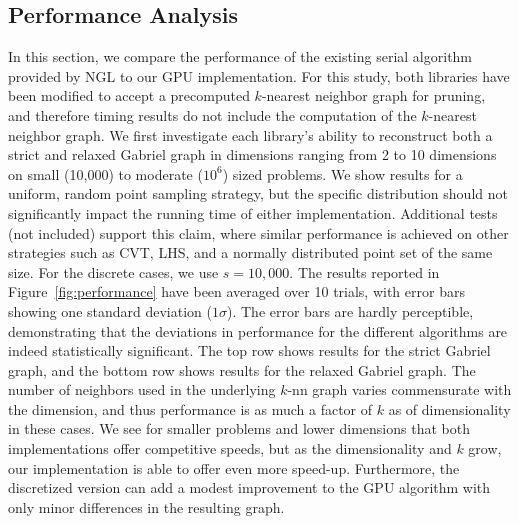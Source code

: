 \subsection{Performance Analysis}

In this section, we compare the performance of the existing serial algorithm provided by NGL to our GPU implementation.
%
For this study, both libraries have been modified to accept a precomputed $k$-nearest neighbor graph for pruning, and therefore timing results do not include the computation of the $k$-nearest neighbor graph.
%
We first investigate each library's ability to reconstruct both a strict and relaxed Gabriel graph in dimensions ranging from 2 to 10 dimensions on small (10,000) to moderate ($10^6$) sized problems.
%
We show results for a uniform, random point sampling strategy, but the specific distribution should not significantly impact the running time of either implementation.
%
Additional tests (not included) support this claim, where similar performance is achieved on other strategies such as CVT, LHS, and a normally distributed point set of the same size.
%
For the discrete cases, we use $s=10,000$.
%
The results reported in Figure~\ref{fig:performance} have been averaged over 10 trials, with error bars showing one standard deviation ($1\sigma$).
%
The error bars are hardly perceptible, demonstrating that the deviations in performance for the different algorithms are indeed statistically significant.
%
The top row shows results for the strict Gabriel graph, and the bottom row shows results for the relaxed Gabriel graph.
%
The number of neighbors used in the underlying $k$-nn graph varies commensurate with the dimension, and thus performance is as much a factor of $k$ as of dimensionality in these cases.
%
We see for smaller problems and lower dimensions that both implementations offer competitive speeds, but as the dimensionality and $k$ grow, our implementation is able to offer even more speed-up.
%
Furthermore, the discretized version can add a modest improvement to the GPU algorithm with only minor differences in the resulting graph.

